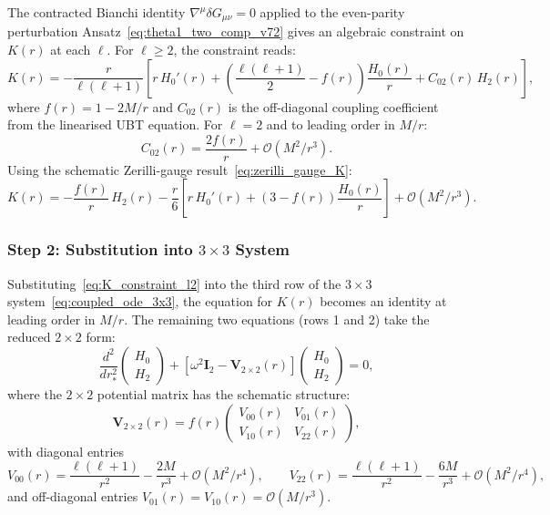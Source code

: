 \documentclass[12pt]{article}
\theoremstyle{definition}
\theoremstyle{remark}
\begin{document}
The contracted Bianchi identity $\nabla^\mu \delta G_{\mu\nu} = 0$ applied to
the even-parity perturbation Ansatz~\eqref{eq:theta1_two_comp_v72} gives an
algebraic constraint on $K(r)$ at each $\ell$.  For $\ell \geq 2$, the
constraint reads:
\begin{equation}
  K(r) = -\frac{r}{\ell(\ell+1)}
    \left[r\,H_0'(r)
      + \left(\frac{\ell(\ell+1)}{2} - f(r)\right)\frac{H_0(r)}{r}
      + C_{02}(r)\,H_2(r)\right],
  \label{eq:K_bianchi_full}
\end{equation}
where $f(r) = 1 - 2M/r$ and $C_{02}(r)$ is the off-diagonal coupling
coefficient from the linearised UBT equation.  For $\ell = 2$ and to leading
order in $M/r$:
\begin{equation}
  C_{02}(r) = \frac{2f(r)}{r} + \mathcal{O}(M^2/r^3).
  \label{eq:C02_leading}
\end{equation}
Using the schematic Zerilli-gauge result~\eqref{eq:zerilli_gauge_K}:
\begin{equation}
  K(r) = -\frac{f(r)}{r}\,H_2(r)
    - \frac{r}{6}\left[r\,H_0'(r) + \left(3 - f(r)\right)\frac{H_0(r)}{r}
      \right]
    + \mathcal{O}(M^2/r^3).
  \label{eq:K_constraint_l2}
\end{equation}

\subsubsection{Step 2: Substitution into $3\times 3$ System}

Substituting~\eqref{eq:K_constraint_l2} into the third row of the $3\times 3$
system~\eqref{eq:coupled_ode_3x3}, the equation for $K(r)$ becomes an
identity at leading order in $M/r$.  The remaining two equations (rows 1 and
2) take the reduced $2\times 2$ form:
\begin{equation}
  \frac{d^2}{dr_*^2}
  \begin{pmatrix} H_0 \\ H_2 \end{pmatrix}
  + \left[\omega^2 \mathbf{I}_2 - \mathbf{V}_{2\times 2}(r)\right]
  \begin{pmatrix} H_0 \\ H_2 \end{pmatrix} = 0,
  \label{eq:2x2_explicit}
\end{equation}
where the $2\times 2$ potential matrix has the schematic structure:
\begin{equation}
  \mathbf{V}_{2\times 2}(r)
    = f(r)\begin{pmatrix}
        V_{00}(r) & V_{01}(r) \\
        V_{10}(r) & V_{22}(r)
      \end{pmatrix},
  \label{eq:V2x2_schematic}
\end{equation}
with diagonal entries
\begin{equation}
  V_{00}(r) = \frac{\ell(\ell+1)}{r^2} - \frac{2M}{r^3} + \mathcal{O}(M^2/r^4),
  \qquad
  V_{22}(r) = \frac{\ell(\ell+1)}{r^2} - \frac{6M}{r^3} + \mathcal{O}(M^2/r^4),
  \label{eq:V_diag}
\end{equation}
and off-diagonal entries $V_{01}(r) = V_{10}(r) = \mathcal{O}(M/r^3)$.
\end{document}
